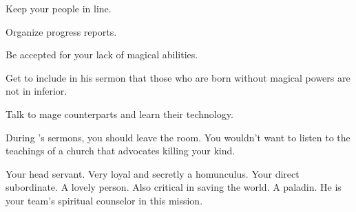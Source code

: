 \documentclass[char]{guildcamp3}
\begin{document}
\begin{itemz}[Goals]
  \item Keep your people in line.
  \item Organize progress reports.
  \item Be accepted for your lack of magical abilities.
  \item Get \cPaladin{} to include in his sermon that those who are born without magical powers are not in inferior.
  \item Talk to mage counterparts and learn their technology.
\end{itemz}

\begin{itemz}[Notes]
	\item During \cPaladin{\formal}'s sermons, you should leave the room. You wouldn't want to listen to the teachings of a church that advocates killing your kind. 
\end{itemz}


\begin{contacts}
  \contact{\cServant{}} Your head servant. Very loyal and secretly a homunculus. 
  \contact{\cNobleTwo{}} Your direct subordinate. 
  \contact{\cMageOne{}} A lovely person. Also critical in saving the world.
  \contact{\cPaladin{}} A paladin. He is your team's spiritual counselor in this mission.
\end{contacts}
\end{document}
